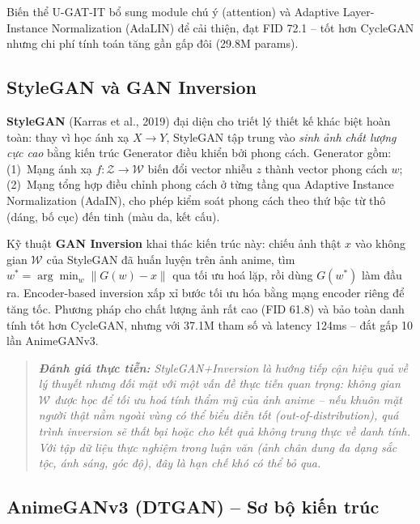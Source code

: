 Biến thể U-GAT-IT \cite{Kim2020} bổ sung module chú ý (attention) và Adaptive Layer-Instance Normalization (AdaLIN) để cải thiện, đạt FID 72.1 -- tốt hơn CycleGAN nhưng chi phí tính toán tăng gần gấp đôi (29.8M params).

\subsection{StyleGAN và GAN Inversion}
\label{subsec:stylegan_inversion}

\textbf{StyleGAN} (Karras et al., 2019) \cite{Karras2019} đại diện cho triết lý thiết kế khác biệt hoàn toàn: thay vì học ánh xạ $X \to Y$, StyleGAN tập trung vào \textit{sinh ảnh chất lượng cực cao} bằng kiến trúc Generator điều khiển bởi phong cách. Generator gồm: (1)~Mạng ánh xạ $f: \mathcal{Z} \to \mathcal{W}$ biến đổi vector nhiễu $z$ thành vector phong cách $w$; (2)~Mạng tổng hợp điều chỉnh phong cách ở từng tầng qua Adaptive Instance Normalization (AdaIN), cho phép kiểm soát phong cách theo thứ bậc từ thô (dáng, bố cục) đến tinh (màu da, kết cấu).

Kỹ thuật \textbf{GAN Inversion} \cite{Xia2022} khai thác kiến trúc này: chiếu ảnh thật $x$ vào không gian $\mathcal{W}$ của StyleGAN đã huấn luyện trên ảnh anime, tìm $w^* = \arg\min_w \|G(w) - x\|$ qua tối ưu hoá lặp, rồi dùng $G(w^*)$ làm đầu ra. Encoder-based inversion \cite{Richardson2021} xấp xỉ bước tối ưu hóa bằng mạng encoder riêng để tăng tốc. Phương pháp cho chất lượng ảnh rất cao (FID 61.8) và bảo toàn danh tính tốt hơn CycleGAN, nhưng với 37.1M tham số và latency 124ms -- đắt gấp 10 lần AnimeGANv3.

\begin{quote}
\textit{\textbf{Đánh giá thực tiễn:} StyleGAN+Inversion là hướng tiếp cận hiệu quả về lý thuyết nhưng đối mặt với một vấn đề thực tiễn quan trọng: không gian $\mathcal{W}$ được học để tối ưu hoá tính thẩm mỹ của ảnh anime -- nếu khuôn mặt người thật nằm ngoài vùng có thể biểu diễn tốt (out-of-distribution), quá trình inversion sẽ thất bại hoặc cho kết quả không trung thực về danh tính. Với tập dữ liệu thực nghiệm trong luận văn (ảnh chân dung đa dạng sắc tộc, ánh sáng, góc độ), đây là hạn chế khó có thể bỏ qua.}
\end{quote}

\subsection{AnimeGANv3 (DTGAN) -- Sơ bộ kiến trúc}
\label{subsec:animegan_overview}

